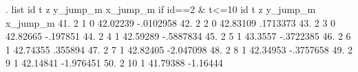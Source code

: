 . list id t z y_jump_m x_jump_m if id==2 \& t<=10
{\smallskip}
      {\TLC}
      {\VBAR} id    t   z   y_jump_m    x_jump_m {\VBAR}
      {\LFTT}
  41. {\VBAR}  2    1   0   42.02239   -.0102958 {\VBAR}
  42. {\VBAR}  2    2   0   42.83109    .1713373 {\VBAR}
  43. {\VBAR}  2    3   0   42.82665    -.197851 {\VBAR}
  44. {\VBAR}  2    4   1   42.59289   -.5887834 {\VBAR}
  45. {\VBAR}  2    5   1    43.3557   -.3722385 {\VBAR}
      {\LFTT}
  46. {\VBAR}  2    6   1   42.74355     .355894 {\VBAR}
  47. {\VBAR}  2    7   1   42.82405   -2.047098 {\VBAR}
  48. {\VBAR}  2    8   1   42.34953   -.3757658 {\VBAR}
  49. {\VBAR}  2    9   1   42.14841   -1.976451 {\VBAR}
  50. {\VBAR}  2   10   1   41.79388    -1.16444 {\VBAR}
      {\BLC}
